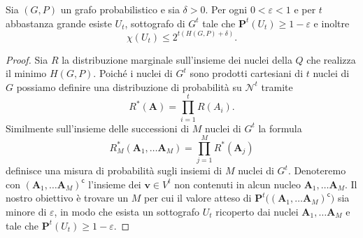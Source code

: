 \begin{theorem}
	[K\"orner] Sia \((G,P)\) un grafo probabilistico e sia \(\delta>0\). Per ogni \(0<\varepsilon<1\) e per \(t\) abbastanza grande esiste \(U_{t}\), sottografo di \(G^{t}\) tale che \(\mathbf{P}^t(U_{t})\ge 1-\varepsilon\) e inoltre
	\[\chi(U_{t})\le 2^{t(H(G,P)+\delta)}.\]
\end{theorem}
\begin{proof}
	Sia \(R\) la distribuzione marginale sull'insieme dei nuclei della \(Q\) che realizza il minimo \(H(G,P)\). Poiché i nuclei di \(G^t\) sono prodotti cartesiani di \(t\) nuclei di \(G\) possiamo definire una distribuzione di probabilità su \(\mathcal{N}^t\) tramite
	\[R^{*}(\mathbf{A}) = \prod_{i=1}^t R(A_{i}).\]
	Similmente sull'insieme delle successioni di \(M\) nuclei di \(G^t\) la formula
	\[R_{M}^{*}(\mathbf{A}_{1},\dots\mathbf{A}_{M}) = \prod_{j=1}^M R^{*}(\mathbf{A}_j)\]
	definisce una misura di probabilità sugli insiemi di \(M\) nuclei di \(G^t\). Denoteremo con \((\mathbf{A}_{1},\dots\mathbf{A}_{M})^{\mathsf{c}}\) l'insieme dei \(\mathbf{v}\in V^{t}\) non contenuti in alcun nucleo \(\mathbf{A}_{1},\dots\mathbf{A}_{M}\). Il nostro obiettivo è trovare un \(M\) per cui il valore atteso di \(\mathbf{P}^t\big((\mathbf{A}_{1},\dots\mathbf{A}_{M})^{\mathsf{c}}\big)\) sia minore di \(\varepsilon\), in modo che esista un sottografo \(U_{t}\) ricoperto dai nuclei \(\mathbf{A}_{1},\dots\mathbf{A}_{M}\) e tale che \(\mathbf{P}^t(U_{t})\ge 1-\varepsilon\).
	

\end{proof}
